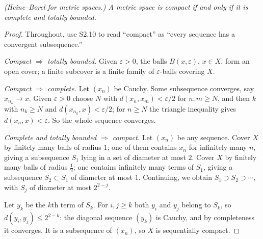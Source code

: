 \emph{(Heine--Borel for metric spaces.) A metric space is compact if and only
if it is complete and totally bounded.}
\begin{proof}
Throughout, use S2.10 to read ``compact'' as ``every sequence has a
convergent subsequence.''

\emph{Compact $\Rightarrow$ totally bounded.} Given $\varepsilon>0$, the
balls $B(x,\varepsilon)$, $x \in X$, form an open cover; a finite subcover is
a finite family of $\varepsilon$-balls covering $X$.

\emph{Compact $\Rightarrow$ complete.} Let $(x_n)$ be Cauchy. Some
subsequence converges, say $x_{n_k} \to x$. Given $\varepsilon>0$ choose $N$
with $d(x_n,x_m)<\varepsilon/2$ for $n,m \ge N$, and then $k$ with
$n_k \ge N$ and $d(x_{n_k},x)<\varepsilon/2$; for $n \ge N$ the triangle
inequality gives $d(x_n,x)<\varepsilon$. So the whole sequence converges.

\emph{Complete and totally bounded $\Rightarrow$ compact.} Let $(x_n)$ be any
sequence. Cover $X$ by finitely many balls of radius $1$; one of them
contains $x_n$ for infinitely many $n$, giving a subsequence $S_1$ lying in
a set of diameter at most $2$. Cover $X$ by finitely many balls of radius
$\tfrac12$; one contains infinitely many terms of $S_1$, giving a
subsequence $S_2 \subset S_1$ of diameter at most $1$. Continuing, we obtain
$S_1 \supset S_2 \supset \cdots$, with $S_j$ of diameter at most $2^{2-j}$.

Let $y_k$ be the $k$th term of $S_k$. For $i,j \ge k$ both $y_i$ and $y_j$
belong to $S_k$, so $d(y_i,y_j) \le 2^{2-k}$: the diagonal sequence $(y_k)$
is Cauchy, and by completeness it converges. It is a subsequence of
$(x_n)$, so $X$ is sequentially compact.
\end{proof}

